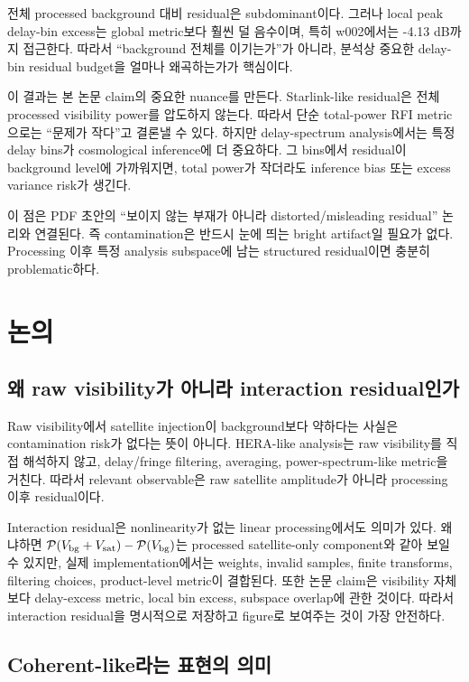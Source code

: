 \documentclass[11pt,a4paper]{article}
\newcommand{\vis}{V}
\begin{document}
전체 processed background 대비 residual은 subdominant이다.
그러나 local peak delay-bin excess는 global metric보다 훨씬 덜 음수이며, 특히 w002에서는 -4.13 dB까지 접근한다.
따라서 ``background 전체를 이기는가''가 아니라, 분석상 중요한 delay-bin residual budget을 얼마나 왜곡하는가가 핵심이다.

이 결과는 본 논문 claim의 중요한 nuance를 만든다.
Starlink-like residual은 전체 processed visibility power를 압도하지 않는다.
따라서 단순 total-power RFI metric으로는 ``문제가 작다''고 결론낼 수 있다.
하지만 delay-spectrum analysis에서는 특정 delay bins가 cosmological inference에 더 중요하다.
그 bins에서 residual이 background level에 가까워지면, total power가 작더라도 inference bias 또는 excess variance risk가 생긴다.

이 점은 PDF 초안의 ``보이지 않는 부재가 아니라 distorted/misleading residual'' 논리와 연결된다.
즉 contamination은 반드시 눈에 띄는 bright artifact일 필요가 없다.
Processing 이후 특정 analysis subspace에 남는 structured residual이면 충분히 problematic하다.

\section{논의}

\subsection{왜 raw visibility가 아니라 interaction residual인가}

Raw visibility에서 satellite injection이 background보다 약하다는 사실은 contamination risk가 없다는 뜻이 아니다.
HERA-like analysis는 raw visibility를 직접 해석하지 않고, delay/fringe filtering, averaging, power-spectrum-like metric을 거친다.
따라서 relevant observable은 raw satellite amplitude가 아니라 processing 이후 residual이다.

Interaction residual은 nonlinearity가 없는 linear processing에서도 의미가 있다.
왜냐하면 ${\cal P}(\vis_{\rm bg}+\vis_{\rm sat})-{\cal P}(\vis_{\rm bg})$는 processed satellite-only component와 같아 보일 수 있지만, 실제 implementation에서는 weights, invalid samples, finite transforms, filtering choices, product-level metric이 결합된다.
또한 논문 claim은 visibility 자체보다 delay-excess metric, local bin excess, subspace overlap에 관한 것이다.
따라서 interaction residual을 명시적으로 저장하고 figure로 보여주는 것이 가장 안전하다.

\subsection{Coherent-like라는 표현의 의미}
\end{document}
